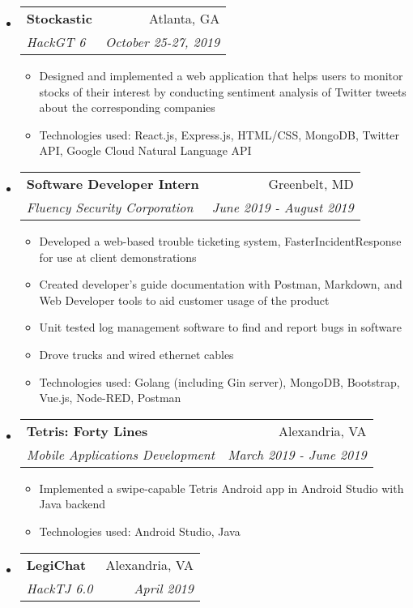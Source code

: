 \documentclass[letterpaper,11pt]{article}
\makeatletter
\newcommand{\resitem}[1]{\item #1 \vspace{-2pt}}
\newcommand{\ressubheading}[4]{
\begin{tabular*}{7.0in}{l@{\extracolsep{\fill}}r}
		\textbf{#1} & #2 \\
		\textit{#3} & \textit{#4} \\
\end{tabular*}\vspace{-6pt}}
\makeatother
\begin{document}
\begin{itemize}
\begin{itemize}
    \end{itemize}
\item
    \ressubheading{Stockastic}{Atlanta, GA}{HackGT 6}{October 25-27, 2019}
    \begin{itemize}
        \item Designed and implemented a web application that helps users to monitor stocks of their interest by conducting sentiment analysis of Twitter tweets about the corresponding companies
        \item Technologies used: React.js, Express.js, HTML/CSS, MongoDB,  Twitter API, Google Cloud Natural Language API
    \end{itemize}
\item
    \ressubheading{Software Developer Intern}{Greenbelt, MD}{Fluency Security Corporation}{June 2019 - August 2019}
	\begin{itemize}
	    \resitem{Developed a web-based trouble ticketing system, FasterIncidentResponse for use at client demonstrations}
		\resitem{Created developer's guide documentation with Postman, Markdown, and Web Developer tools to aid customer usage of the product}
		\resitem{Unit tested log management software to find and report bugs in software}
		\resitem{Drove trucks and wired ethernet cables}
		\resitem{Technologies used: Golang (including Gin server), MongoDB, Bootstrap, Vue.js, Node-RED, Postman}
	\end{itemize}
\item
    \ressubheading{Tetris: Forty Lines}{Alexandria, VA}{Mobile Applications Development}{March 2019 - June 2019}
	\begin{itemize}
		\resitem{Implemented a swipe-capable Tetris Android app in Android Studio with Java backend}
		\resitem{Technologies used: Android Studio, Java}
	\end{itemize}
\item
    \ressubheading{LegiChat}{Alexandria, VA}{HackTJ 6.0}{April 2019}
	\begin{itemize}

\end{itemize}
\end{itemize}
\end{document}
